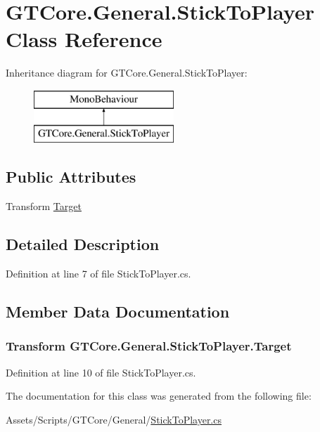 \hypertarget{class_g_t_core_1_1_general_1_1_stick_to_player}{}\section{G\+T\+Core.\+General.\+Stick\+To\+Player Class Reference}
\label{class_g_t_core_1_1_general_1_1_stick_to_player}
Inheritance diagram for G\+T\+Core.\+General.\+Stick\+To\+Player\+:\begin{figure}[H]
\begin{center}
\leavevmode
\includegraphics[height=2.000000cm]{class_g_t_core_1_1_general_1_1_stick_to_player}
\end{center}
\end{figure}
\subsection*{Public Attributes}
\begin{DoxyCompactItemize}
\item 
Transform \hyperlink{class_g_t_core_1_1_general_1_1_stick_to_player_a3a37b72f1e00a986cc40ed1be2f8da02}{Target}
\end{DoxyCompactItemize}


\subsection{Detailed Description}


Definition at line 7 of file Stick\+To\+Player.\+cs.



\subsection{Member Data Documentation}
\hypertarget{class_g_t_core_1_1_general_1_1_stick_to_player_a3a37b72f1e00a986cc40ed1be2f8da02}{}
\subsubsection[{Target}]{\setlength{\rightskip}{0pt plus 5cm}Transform G\+T\+Core.\+General.\+Stick\+To\+Player.\+Target}\label{class_g_t_core_1_1_general_1_1_stick_to_player_a3a37b72f1e00a986cc40ed1be2f8da02}


Definition at line 10 of file Stick\+To\+Player.\+cs.



The documentation for this class was generated from the following file\+:\begin{DoxyCompactItemize}
\item 
Assets/\+Scripts/\+G\+T\+Core/\+General/\hyperlink{_stick_to_player_8cs}{Stick\+To\+Player.\+cs}\end{DoxyCompactItemize}
